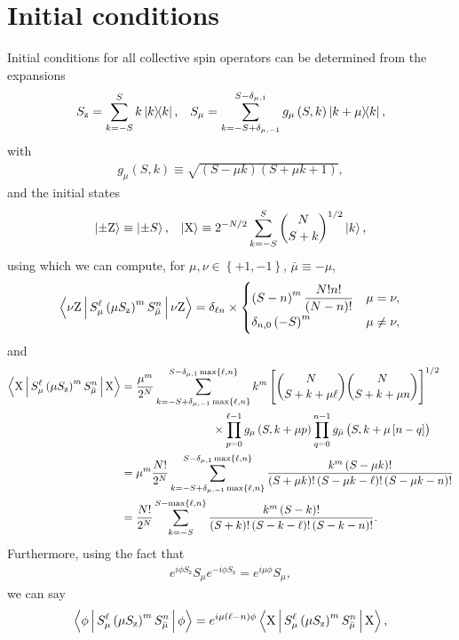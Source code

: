 \documentclass[aps,notitlepage,nofootinbib,11pt]{revtex4-1}
\newcommand{\f}[2]{\dfrac{#1}{#2}} %
\newcommand{\p}[1]{\left(#1\right)} %
\renewcommand{\sp}[1]{\left[#1\right]} %
\renewcommand{\set}[1]{\left\{#1\right\}} %
\newcommand{\bk}{\Braket} %
\newcommand{\z}{\text{z}}
\newcommand{\Z}{\text{Z}}
\newcommand{\X}{\text{X}}
\newcommand{\bmu}{{\bar\mu}}
\newcommand{\1}{\mathds{1}}
\begin{document}
\section{Initial conditions}
\label{sec:initial_conditions}

Initial conditions for all collective spin operators can be determined
from the expansions
\begin{align}
  S_\z = \sum_{k=-S}^S k \op{k},
  &&
  S_\mu = \sum_{k=-S+\delta_{\mu,-1}}^{S-\delta_{\mu,1}}
  g_\mu\p{S,k} \op{k+\mu}{k},
\end{align}
with
\begin{align}
  g_\mu\p{S,k} \equiv \sqrt{\p{S-\mu k}\p{S+\mu k+1}},
\end{align}
and the initial states
\begin{align}
  \ket{\pm\Z} \equiv \ket{\pm S},
  &&
  \ket{\X} \equiv 2^{-N/2} \sum_{k=-S}^S
  { N \choose S+k }^{1/2} \ket{k},
\end{align}
using which we can compute, for $\mu,\nu\in\set{+1,-1}$,
$\bmu\equiv-\mu$,
\begin{align}
  \bk{\nu\Z|S_\mu^\ell \p{\mu S_\z}^m S_\bmu^n|\nu\Z}
  = \delta_{\ell n} \times
  \begin{cases}
     \p{S-n}^m \f{N! n!}{\p{N-n}!} & \mu = \nu, \\
     \delta_{n,0} \p{-S}^m & \mu \ne \nu,
  \end{cases}
\end{align}
and
\begin{align}
  \bk{\X|S_\mu^\ell \p{\mu S_\z}^m S_\bmu^n|\X}
  &=  \f{\mu^m}{2^N} \sum_{k=-S+\delta_{\mu,-1}\max\set{\ell,n}}
  ^{S-\delta_{\mu,1}\max\set{\ell,n}} k^m
  \sp{{ N \choose S+k+\mu\ell } { N \choose S+k+\mu n }}^{1/2}
  \notag \\
  &\qquad\qquad\qquad\qquad
  \times \prod_{p=0}^{\ell-1} g_\mu\p{S,k+\mu p}
  \prod_{q=0}^{n-1} g_\bmu\p{S,k+\mu\sp{n-q}} \\
  &= \mu^m \f{N!}{2^N} \sum_{k=-S+\delta_{\mu,-1}\max\set{\ell,n}}
  ^{S-\delta_{\mu,1}\max\set{\ell,n}}
  \f{k^m \p{S-\mu k}!}
  {\p{S+\mu k}!\p{S-\mu k-\ell}!\p{S-\mu k-n}!} \\
  &= \f{N!}{2^N} \sum_{k=-S}^{S-\max\set{\ell,n}}
  \f{k^m \p{S-k}!}{\p{S+k}!\p{S-k-\ell}!\p{S-k-n}!}.
\end{align}
Furthermore, using the fact that
\begin{align}
  e^{i\phi S_\z} S_\mu e^{-i\phi S_\z} = e^{i\mu\phi} S_\mu,
\end{align}
we can say
\begin{align}
  \bk{\phi|S_\mu^\ell \p{\mu S_\z}^m S_\bmu^n|\phi}
  = e^{i\mu\p{\ell-n}\phi} \bk{\X|S_\mu^\ell \p{\mu S_\z}^m S_\bmu^n|\X},
\end{align}
\end{document}
